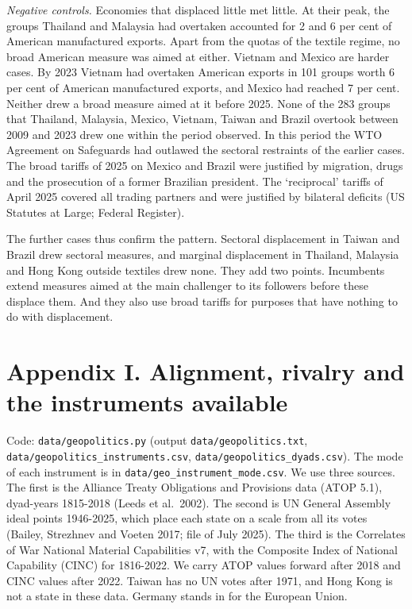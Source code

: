 \emph{Negative controls.} Economies that displaced little met little. At
their peak, the groups Thailand and Malaysia had overtaken accounted for
2 and 6 per cent of American manufactured exports. Apart from the quotas
of the textile regime, no broad American measure was aimed at either.
Vietnam and Mexico are harder cases. By 2023 Vietnam had overtaken
American exports in 101 groups worth 6 per cent of American manufactured
exports, and Mexico had reached 7 per cent. Neither drew a broad measure
aimed at it before 2025. None of the 283 groups that Thailand, Malaysia,
Mexico, Vietnam, Taiwan and Brazil overtook between 2009 and 2023 drew
one within the period observed. In this period the WTO Agreement on
Safeguards had outlawed the sectoral restraints of the earlier cases.
The broad tariffs of 2025 on Mexico and Brazil were justified by
migration, drugs and the prosecution of a former Brazilian president.
The `reciprocal' tariffs of April 2025 covered all trading partners and
were justified by bilateral deficits (US Statutes at Large; Federal
Register).

The further cases thus confirm the pattern. Sectoral displacement in
Taiwan and Brazil drew sectoral measures, and marginal displacement in
Thailand, Malaysia and Hong Kong outside textiles drew none. They add
two points. Incumbents extend measures aimed at the main challenger to
its followers before these displace them. And they also use broad
tariffs for purposes that have nothing to do with displacement.

\hypertarget{i.-alignment-rivalry-and-the-instruments-available}{%
\section*{Appendix I. Alignment, rivalry and the instruments
available}\label{i.-alignment-rivalry-and-the-instruments-available}}

Code: \texttt{data/\allowbreak{}geopolitics.py} (output
\texttt{data/\allowbreak{}geopolitics.txt},
\texttt{data/\allowbreak{}geopolitics\_\allowbreak{}instruments.csv},
\texttt{data/\allowbreak{}geopolitics\_\allowbreak{}dyads.csv}). The mode of each instrument is in
\texttt{data/\allowbreak{}geo\_\allowbreak{}instrument\_\allowbreak{}mode.csv}. We use three sources. The first
is the Alliance Treaty Obligations and Provisions data (ATOP 5.1),
dyad-years 1815-2018 (Leeds et al.~2002). The second is UN General
Assembly ideal points 1946-2025, which place each state on a scale from
all its votes (Bailey, Strezhnev and Voeten 2017; file of July 2025).
The third is the Correlates of War National Material Capabilities v7,
with the Composite Index of National Capability (CINC) for 1816-2022. We
carry ATOP values forward after 2018 and CINC values after 2022. Taiwan
has no UN votes after 1971, and Hong Kong is not a state in these data.
Germany stands in for the European Union.


